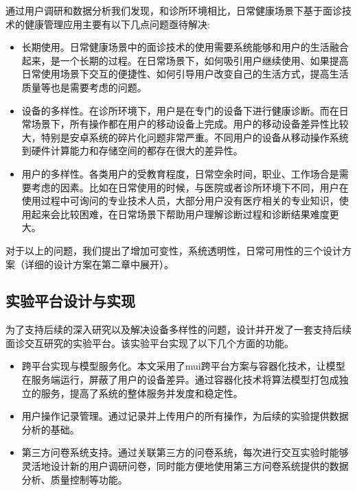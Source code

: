 通过用户调研和数据分析我们发现，和诊所环境相比，日常健康场景下基于面诊技术的健康管理应用主要有以下几点问题亟待解决: 

\begin{itemize}
    
    \item 长期使用。日常健康场景中的面诊技术的使用需要系统能够和用户的生活融合起来，是一个长期的过程。在日常场景下，如何吸引用户继续使用、如果提高日常使用场景下交互的便捷性、如何引导用户改变自己的生活方式，提高生活质量等也是需要考虑的问题。

    \item 设备的多样性。在诊所环境下，用户是在专门的设备下进行健康诊断。而在日常场景下，所有操作都在用户的移动设备上完成。用户的移动设备差异性比较大，特别是安卓系统的碎片化问题非常严重。不同用户的设备从移动操作系统到硬件计算能力和存储空间的都存在很大的差异性。
    
    \item 用户的多样性。各类用户的受教育程度，日常空余时间，职业、工作场合是需要考虑的因素。比如在日常使用的时候，与医院或者诊所环境下不同，用户在使用过程中可询问的专业技术人员，大部分用户没有医疗相关的专业知识，使用起来会比较困难，在日常场景下帮助用户理解诊断过程和诊断结果难度更大。

\end{itemize}

对于以上的问题，我们提出了增加可变性，系统透明性，日常可用性的三个设计方案（详细的设计方案在第二章中展开）。

\subsection{实验平台设计与实现}

为了支持后续的深入研究以及解决设备多样性的问题，设计并开发了一套支持后续面诊交互研究的实验平台。该实验平台实现了以下几个方面的功能。

\begin{itemize}

    \item 跨平台实现与模型服务化。本文采用了mui跨平台方案与容器化技术，让模型在服务端运行，屏蔽了用户的设备差异。通过容器化技术将算法模型打包成独立的服务，提高了系统的整体服务并发度和稳定性。

    \item 用户操作记录管理。通过记录并上传用户的所有操作，为后续的实验提供数据分析的基础。

    \item 第三方问卷系统支持。通过关联第三方的问卷系统，每次进行交互实验时能够灵活地设计新的用户调研问卷，同时能方便地使用第三方问卷系统提供的数据分析、质量控制等功能。

\end{itemize}

